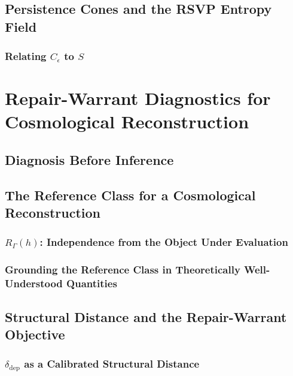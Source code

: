 \documentclass[12pt,a4paper,twoside,openright]{book}
\theoremstyle{plain}
\theoremstyle{definition}
\theoremstyle{remark}
\newcommand{\Sfield}{S}
\newcommand{\RGam}{R_\Gamma}
\newcommand{\ddep}{\delta_{\mathrm{dep}}}
\newcommand{\Pcone}{C_\epsilon}
\begin{document}
\section{Persistence Cones and the RSVP Entropy Field}

\subsection{Relating \texorpdfstring{$\Pcone$}{C\_epsilon} to \texorpdfstring{$\Sfield$}{S}}


\chapter{Repair-Warrant Diagnostics for Cosmological Reconstruction}
\label{ch:repair-warrant-cosmology}


\section{Diagnosis Before Inference}

\section{The Reference Class for a Cosmological Reconstruction}

\subsection{\texorpdfstring{$\RGam(h)$}{R\_Gamma(h)}: Independence from the Object Under Evaluation}
\subsection{Grounding the Reference Class in Theoretically Well-Understood Quantities}

\section{Structural Distance and the Repair-Warrant Objective}

\subsection{\texorpdfstring{$\ddep$}{delta\_dep} as a Calibrated Structural Distance}
\end{document}
